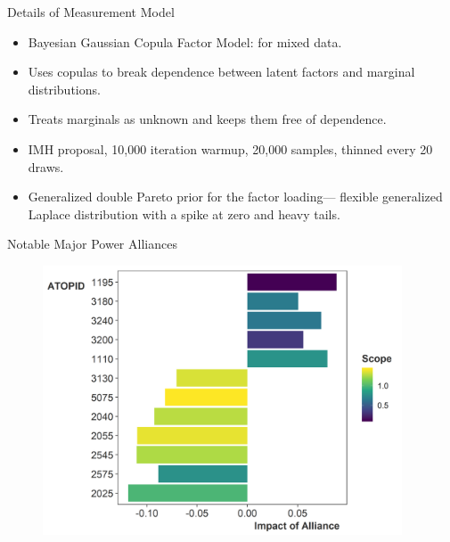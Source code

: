 \documentclass{beamer}
\begin{document}

\begin{frame}{Details of Measurement Model}

\begin{itemize}
\item Bayesian Gaussian Copula Factor Model: for mixed data. 
\item Uses copulas to break dependence between latent factors and marginal distributions. 
\item Treats marginals as unknown and keeps them free of dependence. 
\item IMH proposal, 10,000 iteration warmup, 20,000 samples, thinned every 20 draws. 
\item Generalized double Pareto prior for the factor loading--- flexible generalized Laplace distribution with a spike at zero and heavy tails. 
\end{itemize} 


\end{frame}



\begin{frame}{Notable Major Power Alliances}


\begin{figure}
	\centering
		\includegraphics[width=0.95\textwidth]{non-zero-maj.png}
	\label{fig:non-zero-maj}
\end{figure}


\end{frame}

\end{document}
